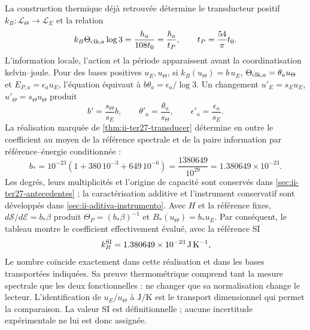 La construction thermique déjà retrouvée détermine le transducteur positif
\(k_B:\mathcal L_\Theta\to\mathcal L_E\) et la relation
\begin{equation}
 k_B\Theta_{{\rm clk},a}\log3
 =\frac{h_a}{108t_0}=\frac{\hbar_a}{t_P},
 \qquad t_P=\frac{54}{\pi}t_0.
 \label{eq:ii-kb-comparacion}
\end{equation}
L’information locale, l’action et la période apparaissent avant la coordinatisation
kelvin--joule. Pour des bases positives \(u_E,u_\Theta\), si
\(k_B(u_\Theta)=b\,u_E\),
\(\Theta_{{\rm clk},a}=\theta_a u_\Theta\) et
\(E_{P,a}=\epsilon_a u_E\), l’équation équivaut à
\(b\theta_a=\epsilon_a/\log3\). Un changement
\(u'_E=s_Eu_E\), \(u'_\Theta=s_\Theta u_\Theta\) produit
\[
 b'=\frac{s_\Theta}{s_E}b,\qquad
 \theta'_a=\frac{\theta_a}{s_\Theta},\qquad
 \epsilon'_a=\frac{\epsilon_a}{s_E}.
\]
La réalisation marquée de \ref{thm:ii-ter27-transducer} détermine
en outre le coefficient au moyen de la référence spectrale et de la paire
information par référence--énergie conditionnée :
\begin{equation}
 b_*=10^{-23}\left(1+380\,10^{-3}+649\,10^{-6}\right)
     =\frac{1380649}{10^{29}}=1.380649\times10^{-23}.
 \label{eq:ii-b-evaluacion-comparada}
\end{equation}
Les degrés, leurs multiplicités et l’origine de capacité sont conservés
dans \ref{sec:ii-ter27-antecedentes} ; la caractérisation additive et
l’instrument conservatif sont développés dans
\ref{sec:ii-aditiva-instrumento}. Avec $H$ et la référence fixes,
$d\mathcal S/d\mathcal E=b_*\beta$ produit
$\Theta_P=(b_*\beta)^{-1}$ et $B_*(u_\Theta)=b_*u_E$.
Par conséquent, le tableau montre le coefficient effectivement évalué,
avec la référence SI
\[
 k_B^{\rm SI}=1.380649\times10^{-23}\,\mathrm{J\,K^{-1}},
\]
Le nombre coïncide exactement dans cette réalisation et dans les bases
transportées indiquées. Sa preuve thermométrique comprend tant la mesure
spectrale que les deux fonctionnelles : ne changer que sa normalisation change
le lecteur. L’identification de $u_E/u_\Theta$ à $\mathrm{J/K}$ est
le transport dimensionnel qui permet la comparaison. La valeur SI est
définitionnelle ; aucune incertitude expérimentale ne lui est donc assignée.

